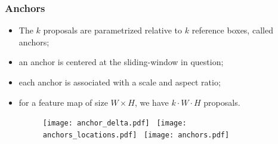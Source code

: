 \documentclass{beamer}
\begin{document}

			\begin{frame}\frametitle{Anchors}
				\begin{itemize}
					\item The $k$ proposals are parametrized relative to $k$ reference boxes, called anchors;
					\item an anchor is centered at the sliding-window in question;
					\item each anchor is associated with a scale and aspect ratio;
					\item for a feature map of size $W\times H$, we have $k \cdot W \cdot H$ proposals.
					\begin{figure}
						\texttt{[image: anchor\_delta.pdf]}~
						\texttt{[image: anchors\_locations.pdf]}~
						\texttt{[image: anchors.pdf]}
					\end{figure}
				\end{itemize}
			\end{frame}
\end{document}
